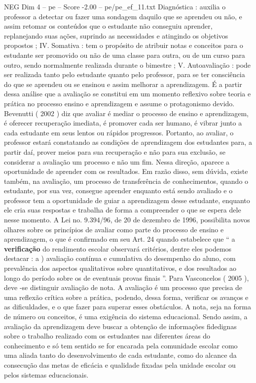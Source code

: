 \begin{textsample}{NEG Dim 4 – pe – Score -2.00 – pe/pe\_ef\_11.txt}
Diagnóstica : auxilia o professor a detectar ou fazer uma sondagem daquilo que se aprendeu ou não, e assim retomar os conteúdos que o estudante não conseguiu aprender, replanejando suas ações, suprindo as necessidades e atingindo os objetivos propostos ; IV.
Somativa : tem o propósito de atribuir notas e conceitos para o estudante ser promovido ou não de uma classe para outra, ou de um curso para outro, sendo normalmente realizada durante o bimestre ; V.
Autoavaliação : pode ser realizada tanto pelo estudante quanto pelo professor, para se ter consciência do que se aprendeu ou se ensinou e assim melhorar a aprendizagem.
É a partir dessa análise que a avaliação se constitui em um momento reflexivo sobre teoria e prática no processo ensino e aprendizagem e assume o protagonismo devido.
Bevenutti ( 2002 ) diz que avaliar é mediar o processo de ensino e aprendizagem, é oferecer recuperação imediata, é promover cada ser humano, é vibrar junto a cada estudante em seus lentos ou rápidos progressos.
Portanto, ao avaliar, o professor estará constatando as condições de aprendizagem dos estudantes para, a partir daí, prover meios para sua recuperação e não para sua exclusão, se considerar a avaliação um processo e não um fim.
Nessa direção, aparece a oportunidade de aprender com os resultados.
Em razão disso, sem dúvida, existe também, na avaliação, um processo de transferência de conhecimentos, quando o estudante, por sua vez, consegue aprender enquanto está sendo avaliado e o professor tem a oportunidade de guiar a aprendizagem desse estudante, enquanto ele cria suas respostas e trabalha de forma a compreender o que se espera dele nesse momento.
A Lei no. 9.394/96, de 20 de dezembro de 1996, possibilita novos olhares sobre os princípios de avaliar como parte do processo de ensino e aprendizagem, o que é confirmado em seu Art. 24 quando estabelece que “ a \textbf{verificação} do rendimento escolar observará critérios, dentre eles podemos destacar : a ) avaliação contínua e cumulativa do desempenho do aluno, com prevalência dos aspectos qualitativos sobre quantitativos, e dos resultados ao longo do período sobre os de eventuais provas finais ”.
Para Vasconcelos ( 2005 ), deve -se distinguir avaliação de nota.
A avaliação é um processo que precisa de uma reflexão crítica sobre a prática, podendo, dessa forma, verificar os avanços e as dificuldades, e o que fazer para superar esses obstáculos.
A nota, seja na forma de número ou conceitos, é uma exigência do sistema educacional.
Sendo assim, a avaliação da aprendizagem deve buscar a obtenção de informações fidedignas sobre o trabalho realizado com os estudantes nas diferentes áreas do conhecimento e só tem sentido se for encarada pela comunidade escolar como uma aliada tanto do desenvolvimento de cada estudante, como do alcance da consecução das metas de eficácia e qualidade fixadas pela unidade escolar ou pelos sistemas educacionais.

\end{textsample}
